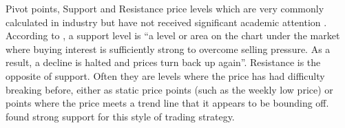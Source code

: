 \documentclass{article}
\theoremstyle{definition}
\begin{document}
Pivot points, Support and Resistance price levels which are very commonly calculated in industry but have not received significant academic attention \citep[p. 55]{osler2000support}. According to \cite{murphy1999technical}, a support level is ``a level or area on the chart under the market where buying interest is sufficiently strong to overcome selling pressure. As a result, a decline is halted and prices turn back up again''. Resistance is the opposite of support. Often they are levels where the price has had difficulty breaking before, either as static price points (such as the weekly low price) or points where the price meets a trend line that it appears to be bounding off. \cite{brock1992} found strong support for this style of trading strategy.




\end{document}
